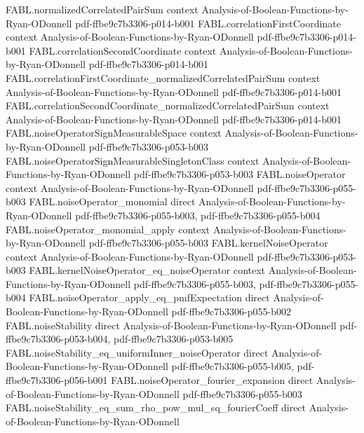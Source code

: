 \begin{theorem}
\proofstep
  {FABL.normalizedCorrelatedPairSum}
  {context}
  {Analysis-of-Boolean-Functions-by-Ryan-ODonnell}
  {pdf-ffbe9c7b3306-p014-b001}
\proofstep
  {FABL.correlationFirstCoordinate}
  {context}
  {Analysis-of-Boolean-Functions-by-Ryan-ODonnell}
  {pdf-ffbe9c7b3306-p014-b001}
\proofstep
  {FABL.correlationSecondCoordinate}
  {context}
  {Analysis-of-Boolean-Functions-by-Ryan-ODonnell}
  {pdf-ffbe9c7b3306-p014-b001}
\proofstep
  {FABL.correlationFirstCoordinate_normalizedCorrelatedPairSum}
  {context}
  {Analysis-of-Boolean-Functions-by-Ryan-ODonnell}
  {pdf-ffbe9c7b3306-p014-b001}
\proofstep
  {FABL.correlationSecondCoordinate_normalizedCorrelatedPairSum}
  {context}
  {Analysis-of-Boolean-Functions-by-Ryan-ODonnell}
  {pdf-ffbe9c7b3306-p014-b001}
\proofstep
  {FABL.noiseOperatorSignMeasurableSpace}
  {context}
  {Analysis-of-Boolean-Functions-by-Ryan-ODonnell}
  {pdf-ffbe9c7b3306-p053-b003}
\proofstep
  {FABL.noiseOperatorSignMeasurableSingletonClass}
  {context}
  {Analysis-of-Boolean-Functions-by-Ryan-ODonnell}
  {pdf-ffbe9c7b3306-p053-b003}
\proofstep
  {FABL.noiseOperator}
  {context}
  {Analysis-of-Boolean-Functions-by-Ryan-ODonnell}
  {pdf-ffbe9c7b3306-p055-b003}
\proofstep
  {FABL.noiseOperator_monomial}
  {direct}
  {Analysis-of-Boolean-Functions-by-Ryan-ODonnell}
  {pdf-ffbe9c7b3306-p055-b003,
    pdf-ffbe9c7b3306-p055-b004}
\proofstep
  {FABL.noiseOperator_monomial_apply}
  {context}
  {Analysis-of-Boolean-Functions-by-Ryan-ODonnell}
  {pdf-ffbe9c7b3306-p055-b003}
\proofstep
  {FABL.kernelNoiseOperator}
  {context}
  {Analysis-of-Boolean-Functions-by-Ryan-ODonnell}
  {pdf-ffbe9c7b3306-p053-b003}
\proofstep
  {FABL.kernelNoiseOperator_eq_noiseOperator}
  {context}
  {Analysis-of-Boolean-Functions-by-Ryan-ODonnell}
  {pdf-ffbe9c7b3306-p055-b003,
    pdf-ffbe9c7b3306-p055-b004}
\proofstep
  {FABL.noiseOperator_apply_eq_pmfExpectation}
  {direct}
  {Analysis-of-Boolean-Functions-by-Ryan-ODonnell}
  {pdf-ffbe9c7b3306-p055-b002}
\proofstep
  {FABL.noiseStability}
  {direct}
  {Analysis-of-Boolean-Functions-by-Ryan-ODonnell}
  {pdf-ffbe9c7b3306-p053-b004,
    pdf-ffbe9c7b3306-p053-b005}
\proofstep
  {FABL.noiseStability_eq_uniformInner_noiseOperator}
  {direct}
  {Analysis-of-Boolean-Functions-by-Ryan-ODonnell}
  {pdf-ffbe9c7b3306-p055-b005,
    pdf-ffbe9c7b3306-p056-b001}
\proofstep
  {FABL.noiseOperator_fourier_expansion}
  {direct}
  {Analysis-of-Boolean-Functions-by-Ryan-ODonnell}
  {pdf-ffbe9c7b3306-p055-b003}
\proofstep
  {FABL.noiseStability_eq_sum_rho_pow_mul_sq_fourierCoeff}
  {direct}
  {Analysis-of-Boolean-Functions-by-Ryan-ODonnell}

\end{theorem}
